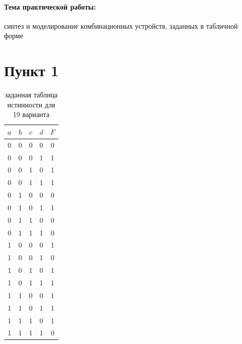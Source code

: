 \documentclass[a4paper]{article}
\begin{document}
  \paragraph{Тема практической работы:} синтез и моделирование комбинационных устройств, заданных в
  табличной форме
  
  \section*{Пункт 1}
  \begin{table}[H]
    \centering
    \begin{tabular}{| c | c | c | c | c |}
        \hline
        $a$ & $b$ & $c$ & $d$ & $F$ \\
        \hline
        0 & 0 & 0 & 0 & 0\\
        0 & 0 & 0 & 1 & 1\\
        0 & 0 & 1 & 0 & 1\\
        0 & 0 & 1 & 1 & 1\\
        0 & 1 & 0 & 0 & 0\\
        0 & 1 & 0 & 1 & 1\\
        0 & 1 & 1 & 0 & 0\\
        0 & 1 & 1 & 1 & 0\\

        1 & 0 & 0 & 0 & 1\\
        1 & 0 & 0 & 1 & 0\\
        1 & 0 & 1 & 0 & 1\\
        1 & 0 & 1 & 1 & 1\\
        1 & 1 & 0 & 0 & 1\\
        1 & 1 & 0 & 1 & 1\\
        1 & 1 & 1 & 0 & 1\\
        1 & 1 & 1 & 1 & 0\\
        \hline

    \end{tabular}

    \caption{заданная таблица истинности для 19 варианта}
  \end{table}
\end{document}
